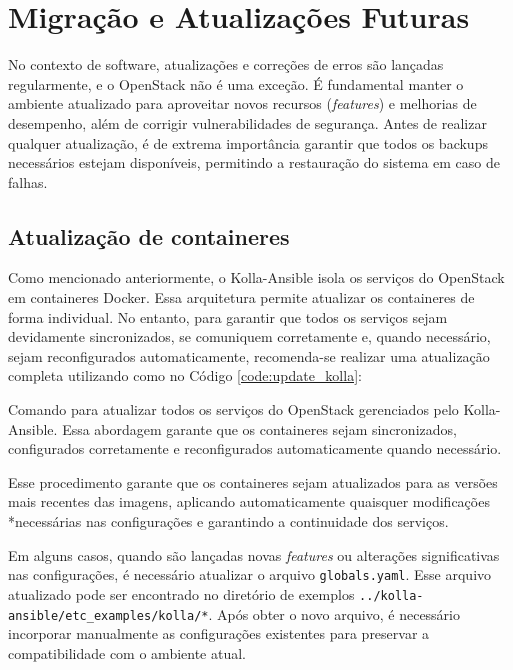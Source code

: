 \section{Migração e Atualizações Futuras}

No contexto de software, atualizações e correções de erros são lançadas regularmente, e o OpenStack não é uma exceção. É fundamental manter o ambiente atualizado para aproveitar novos recursos (\textit{features}) e melhorias de desempenho, além de corrigir vulnerabilidades de segurança. Antes de realizar qualquer atualização, é de extrema importância garantir que todos os backups necessários estejam disponíveis, permitindo a restauração do sistema em caso de falhas.

\subsection{Atualização de containeres}

Como mencionado anteriormente, o Kolla-Ansible isola os serviços do OpenStack em containeres Docker. Essa arquitetura permite atualizar os containeres de forma individual. No entanto, para garantir que todos os serviços sejam devidamente sincronizados, se comuniquem corretamente e, quando necessário, sejam reconfigurados automaticamente, recomenda-se realizar uma atualização completa utilizando como no Código \ref{code:update_kolla}:

\begin{listing}[h!]
    \noindent{}  
  \caption{Comando para atualizar todos os serviços do OpenStack gerenciados pelo Kolla-Ansible. Essa abordagem garante que os containeres sejam sincronizados, configurados corretamente e reconfigurados automaticamente quando necessário.}
  \label{code:update_kolla}
\end{listing}

Esse procedimento garante que os containeres sejam atualizados para as versões mais recentes das imagens, aplicando automaticamente quaisquer modificações *necessárias nas configurações e garantindo a continuidade dos serviços.

Em alguns casos, quando são lançadas novas \textit{features} ou alterações significativas nas configurações, é necessário atualizar o arquivo \texttt{globals.yaml}. Esse arquivo atualizado pode ser encontrado no diretório de exemplos \texttt{../kolla-ansible/etc\_examples/kolla/*}. Após obter o novo arquivo, é necessário incorporar manualmente as configurações existentes para preservar a compatibilidade com o ambiente atual.


